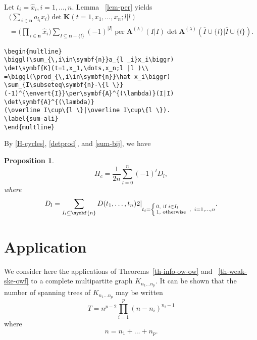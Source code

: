 \documentclass{article}
\newtheorem{prop}[thm]{Proposition}
\theoremstyle{definition}
\theoremstyle{remark}
\DeclareMathOperator{\per}{per}
\newcommand{\eval}[2][\right]{\relax
  \ifx#1\right\relax \left.\fi#2#1\rvert}
\newcommand{\envert}[1]{\left\lvert#1\right\rvert}
\begin{document}
Let $t_i=\hat x_i,i=1,\dots,n$. Lemma ~\ref{lem-per} yields
\begin{multline}
\biggl(\sum_{\,i\in\symbf{n}}a_{l _i}x_i\biggr)
\det\symbf{K}(t=1,x_1,\dots,x_n;l |l )\\
=\biggl(\prod_{\,i\in\symbf{n}}\hat x_i\biggr)
\sum_{I\subseteq\symbf{n}-\{l \}}
(-1)^{\envert{I}}\per\symbf{A}^{(\lambda)}(I|I)
\det\symbf{A}^{(\lambda)}
(\overline I\cup\{l \}|\overline I\cup\{l \}).
\label{sum-ali}
\end{multline}
\begin{verbatim}
\begin{multline}
\biggl(\sum_{\,i\in\symbf{n}}a_{l _i}x_i\biggr)
\det\symbf{K}(t=1,x_1,\dots,x_n;l |l )\\
=\biggl(\prod_{\,i\in\symbf{n}}\hat x_i\biggr)
\sum_{I\subseteq\symbf{n}-\{l \}}
(-1)^{\envert{I}}\per\symbf{A}^{(\lambda)}(I|I)
\det\symbf{A}^{(\lambda)}
(\overline I\cup\{l \}|\overline I\cup\{l \}).
\label{sum-ali}
\end{multline}
\end{verbatim}

By \eqref{H-cycles}, \eqref{detprod}, and \eqref{sum-bij}, we have
\begin{prop}\label{prop:eg}
\begin{equation}
H_c=\frac1{2n}\sum^n_{l =0}(-1)^{l}
D_{l},
\end{equation}
where
\begin{equation}\label{delta-l}
D_{l}=\eval[2]{\sum_{I_{l}\subseteq \symbf{n}}
D(t_1,\dots,t_n)}_{t_i=\left\{\begin{smallmatrix}
0,& \text{if }i\in I_{l}\quad\\%
1,& \text{otherwise}\end{smallmatrix}\right.\;,\;\; i=1,\dots,n}.
\end{equation}
\end{prop}

\section{Application}
\label{lincomp}

We consider here the applications of Theorems~\ref{th-info-ow-ow} and
~\ref{th-weak-ske-owf} to a complete
multipartite graph $K_{n_1\dots n_p}$. It can be shown that the
number of spanning trees of $K_{n_1\dots n_p}$
may be written
\begin{equation}\label{e:st}
T=n^{p-2}\prod^p_{i=1}
(n-n_i)^{n_i-1}
\end{equation}
where
\begin{equation}
n=n_1+\dots+n_p.
\end{equation}
\end{document}
